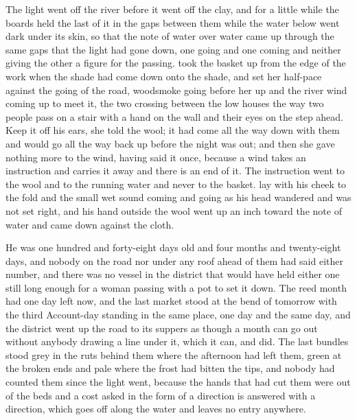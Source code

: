 The light went off the river before it went off the clay, and for a little while the boards held the last of it in the gaps between them while the water below went dark under its skin, so that the note of water over water came up through the same gaps that the light had gone down, one going and one coming and neither giving the other a figure for the passing.  took the basket up from the edge of the work when the shade had come down onto the shade, and set her half-pace against the going of the road, woodsmoke going before her up  and the river wind coming up to meet it, the two crossing between the low houses the way two people pass on a stair with a hand on the wall and their eyes on the step ahead. Keep it off his ears, she told the wool; it had come all the way down with them and would go all the way back up before the night was out; and then she gave nothing more to the wind, having said it once, because a wind takes an instruction and carries it away and there is an end of it. The instruction went to the wool and to the running water and never to the basket.  lay with his cheek to the fold and the small wet sound coming and going as his head wandered and was not set right, and his hand outside the wool went up an inch toward the note of water and came down against the cloth.

He was one hundred and forty-eight days old and four months and twenty-eight days, and nobody on the road nor under any roof ahead of them had said either number, and there was no vessel in the district that would have held either one still long enough for a woman passing with a pot to set it down. The reed month had one day left now, and the last market stood at the bend of tomorrow with the third Account-day standing in the same place, one day and the same day, and the district went up the road to its suppers as though a month can go out without anybody drawing a line under it, which it can, and did. The last bundles stood grey in the ruts behind them where the afternoon had left them, green at the broken ends and pale where the frost had bitten the tips, and nobody had counted them since the light went, because the hands that had cut them were out of the beds and a cost asked in the form of a direction is answered with a direction, which goes off along the water and leaves no entry anywhere.

